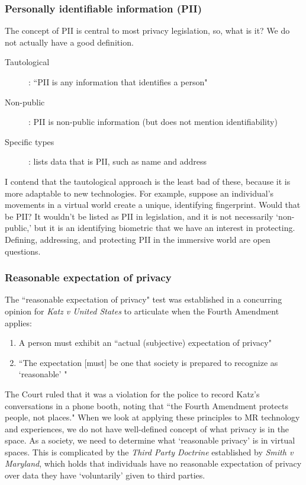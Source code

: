 \subsubsection{Personally identifiable information (PII)}
The concept of PII is central to most privacy legislation, so, what is it? We do not actually have a good definition.
\begin{description}
	\item[Tautological]: ``PII is any information that identifies a person"
	\item[Non-public]: PII is non-public information (but does not mention identifiability)
	\item[Specific types]: lists data that is PII, such as name and address
\end{description}

I contend that the tautological approach is the least bad of these, because it is more adaptable to new technologies. For example, suppose an individual's movements in a virtual world create a unique, identifying fingerprint. Would that be PII? It wouldn't be listed as PII in legislation, and it is not necessarily `non-public,' but it is an identifying biometric that we have an interest in protecting. Defining, addressing, and protecting PII in the immersive world are open questions.


\subsubsection{Reasonable expectation of privacy}
The ``reasonable expectation of privacy" test was established in a concurring opinion for \emph{Katz v United States}\cite{katz1967} to articulate when the Fourth Amendment applies:
\begin{enumerate}
	\item A person must exhibit an ``actual (subjective) expectation of privacy"
	\item ``The expectation [must] be one that society is  prepared to recognize as `reasonable' "
\end{enumerate}

The Court ruled that it was a violation for the police to record Katz's conversations in a phone booth, noting that ``the Fourth Amendment protects people, not places." When we look at applying these principles to MR technology and experiences, we do not have well-defined concept of what privacy is in the space. As a society, we need to determine what `reasonable privacy' is in virtual spaces. This is complicated by the \emph{Third Party Doctrine} established by \emph{Smith v Maryland}\cite{1979smith}, which holds that individuals have no reasonable expectation of privacy over data they have `voluntarily' given to third parties.

